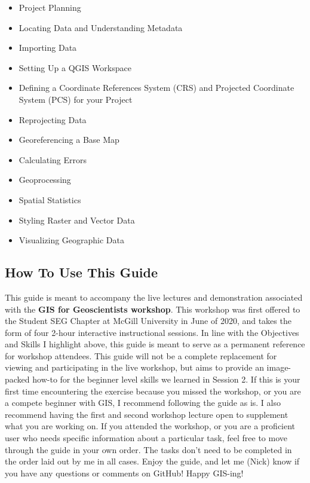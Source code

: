 \documentclass{article}
\begin{document}
\begin{itemize}
  \item Project Planning
  \item Locating Data and Understanding Metadata
  \item Importing Data
  \item Setting Up a QGIS Workspace
  \item Defining a Coordinate References System (CRS) and Projected Coordinate System (PCS) for your Project
  \item Reprojecting Data
  \item Georeferencing a Base Map
  \item Calculating Errors
  \item Geoprocessing
  \item Spatial Statistics
  \item Styling Raster and Vector Data
  \item Visualizing Geographic Data
\end{itemize}

\subsection{How To Use This Guide}

This guide is meant to accompany the live lectures and demonstration associated with the \textbf{GIS for Geoscientists workshop}. This workshop was first offered to the Student SEG Chapter at McGill University in June of 2020, and takes the form of four 2-hour interactive instructional sessions. In line with the Objectives and Skills I highlight above, this guide is meant to serve as a permanent reference for workshop attendees. This guide will not be a complete replacement for viewing and participating in the live workshop, but aims to provide an image-packed how-to for the beginner level skills we learned in Session 2. If this is your first time encountering the exercise because you missed the workshop, or you are a compete beginner with GIS, I recommend following the guide as is. I also recommend having the first and second workshop lecture open to supplement what you are working on. If you attended the workshop, or you are a proficient user who needs specific information about a particular task, feel free to move through the guide in your own order. The tasks don't need to be completed in the order laid out by me in all cases. Enjoy the guide, and let me (Nick) know if you have any questions or comments on GitHub! Happy GIS-ing!
\end{document}
